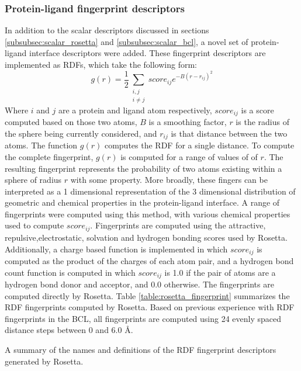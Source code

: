 \subsubsection{Protein-ligand fingerprint descriptors}
In addition to the scalar descriptors  discussed in sections \ref{subsubsec:scalar_rosetta} and \ref{subsubsec:scalar_bcl}, a novel set of protein-ligand interface descriptors were added.
These fingerprint descriptors are implemented as RDFs, which take the following form:
\begin{equation}
g(r) = \frac{1}{2}\sum_{\substack{i,j \\ i \neq j}}score_{ij}e^{-B(r-r_{ij})^{2}}
\end{equation}
Where $i$ and $j$ are a protein and ligand atom respectively, $score_{ij}$ is a score computed based on those two atoms, $B$ is a smoothing factor, $r$ is the radius of the sphere being currently considered, and $r_{ij}$ is that distance between the two atoms.
The function $g(r)$ computes the RDF for a single distance.  To compute the complete fingerprint, $g(r)$ is computed for a range of values of of $r$.
The resulting fingerprint represents the probability of two atoms existing within a sphere of radius $r$ with some property. 
More broadly, these fingers can be interpreted as a 1 dimensional representation of the 3 dimensional distribution of geometric and chemical properties in the protein-ligand interface. 
A range of fingerprints were computed using this method, with various chemical properties used to compute $score_{ij}$.
Fingerprints are computed using the attractive, repulsive,electrostatic, solvation and hydrogen bonding scores used by Rosetta.  Additionally, a charge based function is implemented in which $score_{ij}$ is computed as the product of the charges of each atom pair, and a hydrogen bond count function is computed in which $score_{ij}$ is 1.0 if the pair of atoms are a hydrogen bond donor and acceptor, and 0.0 otherwise.
The fingerprints are computed directly by Rosetta.
Table \ref{table:rosetta_fingerprint} summarizes the RDF fingerprints computed by Rosetta.
Based on previous experience with RDF fingerprints in the BCL, all fingerprints are computed using 24 evenly spaced distance steps between 0 and 6.0 \AA.
\begin{table}
\scriptsize
\renewcommand{\tabcolsep}{0.09cm}
\centering

\caption{A summary of the names and definitions of the RDF fingerprint descriptors generated by Rosetta. }
\label{table:rosetta_fingerprint}
\end{table}

